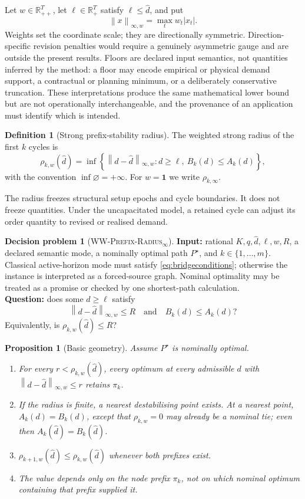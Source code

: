 \documentclass[11pt]{article}
\newtheorem{proposition}[theorem]{Proposition}
\theoremstyle{definition}
\newtheorem{definition}[theorem]{Definition}
\newtheorem{problem}[theorem]{Decision problem}
\newcommand{\R}{\mathbb{R}}
\newcommand{\norm}[1]{\left\lVert #1\right\rVert}
\newcommand{\winf}[1]{\left\lVert #1\right\rVert_{\infty,w}}
\newcommand{\WWR}{\textsc{WW-Prefix-Radius}\ensuremath{_{\infty}}}
\newcommand{\dhat}{\widehat d}
\newcommand{\ellv}{\ell}
\newcommand{\one}{\mathbf{1}}
\begin{document}
Let $w\in\R_{++}^T$, let $\ellv\in\R_+^T$ satisfy $\ellv\le\dhat$, and put
\[
\norm{x}_{\infty,w}=\max_t w_t|x_t|.
\]
Weights set the coordinate scale; they are directionally symmetric. Direction-specific revision penalties would require a genuinely asymmetric gauge and are outside the present results. Floors are declared input semantics, not quantities inferred by the method: a floor may encode empirical or physical demand support, a contractual or planning minimum, or a deliberately conservative truncation. These interpretations produce the same mathematical lower bound but are not operationally interchangeable, and the provenance of an application must identify which is intended.

\begin{definition}[Strong prefix-stability radius]\label{def:radius}
The weighted strong radius of the first $k$ cycles is
\begin{equation}\label{eq:rho}
\rho_{k,w}(\dhat)=
\inf\left\{
\winf{d-\dhat}: d\ge\ellv,\ B_k(d)\le A_k(d)
\right\},
\end{equation}
with the convention $\inf\varnothing=+\infty$. For $w=\one$ we write $\rho_{k,\infty}$.
\end{definition}

The radius freezes structural setup epochs and cycle boundaries. It does not freeze quantities. Under the uncapacitated model, a retained cycle can adjust its order quantity to revised or realised demand.

\begin{problem}[\WWR]\label{prob:decision}
\textbf{Input:} rational $K,q,\dhat,\ellv,w,R$, a declared semantic mode, a nominally optimal path $P^\star$, and $k\in\{1,\ldots,m\}$. Classical active-horizon mode must satisfy \eqref{eq:bridgeconditions}; otherwise the instance is interpreted as a forced-source graph. Nominal optimality may be treated as a promise or checked by one shortest-path calculation.\\
\textbf{Question:} does some $d\ge\ellv$ satisfy
\[
\winf{d-\dhat}\le R
\quad\text{and}\quad
B_k(d)\le A_k(d)?
\]
Equivalently, is $\rho_{k,w}(\dhat)\le R$?
\end{problem}

\begin{proposition}[Basic geometry]\label{prop:geometry}
Assume $P^\star$ is nominally optimal.
\begin{enumerate}[label=(\alph*)]
\item For every $r<\rho_{k,w}(\dhat)$, every optimum at every admissible $d$ with $\winf{d-\dhat}\le r$ retains $\pi_k$.
\item If the radius is finite, a nearest destabilising point exists. At a nearest point, $A_k(d)=B_k(d)$, except that $\rho_{k,w}=0$ may already be a nominal tie; even then $A_k(\dhat)=B_k(\dhat)$.
\item $\rho_{k+1,w}(\dhat)\le\rho_{k,w}(\dhat)$ whenever both prefixes exist.
\item The value depends only on the node prefix $\pi_k$, not on which nominal optimum containing that prefix supplied it.
\end{enumerate}
\end{proposition}
\end{document}
